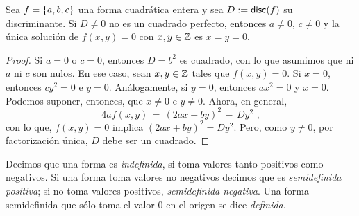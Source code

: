 \begin{lemaDefiniciones}\label{lema:definiciones:discriminante-no-cuadrado}
	Sea $f=\left\{a,b,c\right\}$ una forma cuadr\'atica entera
	y sea $D:=\mathsf{disc}(f)$ su discriminante.
	Si $D\neq 0$ no es un cuadrado perfecto, entonces $a\neq 0$,
	$c\neq 0$ y la \'unica soluci\'on de $f(x,y)=0$ con
	$x,y\in\mathbb{Z}$ es $x=y=0$.
\end{lemaDefiniciones}


\begin{proof}
	Si $a=0$ o $c=0$, entonces $D=b^2$ es cuadrado, con lo
	que asumimos que ni $a$ ni $c$ son nulos. En ese caso,
	sean $x,y\in\mathbb{Z}$ tales que $f(x,y)=0$.
	Si $x=0$, entonces $cy^2=0$ e $y=0$.
	An\'alogamente, si $y=0$, entonces $ax^2=0$ y $x=0$.
	Podemos suponer, entonces, que $x\neq 0$ e $y\neq 0$.
	Ahora, en general,
	\begin{equation}
		\label{eq:definiciones:completar}
		4af(x,y)\,=\,(2ax+by)^2\,-\,Dy^2
		\text{ ,}
	\end{equation}
	con lo que, $f(x,y)=0$ implica $(2ax+by)^2=Dy^2$. Pero,
	como $y\neq 0$, por factorizaci\'on \'unica, $D$ debe
	ser un cuadrado.
\end{proof}

\begin{defDefiniciones}\label{def:definiciones:valores}
	Decimos que una forma es \emph{indefinida}, si toma valores
	tanto positivos como negativos. Si una forma toma valores
	no negativos decimos que es \emph{semidefinida positiva};
	si no toma valores positivos, \emph{semidefinida negativa}.
	Una forma semidefinida que s\'olo toma el valor $0$ en el
	origen se dice \emph{definida}.
\end{defDefiniciones}


